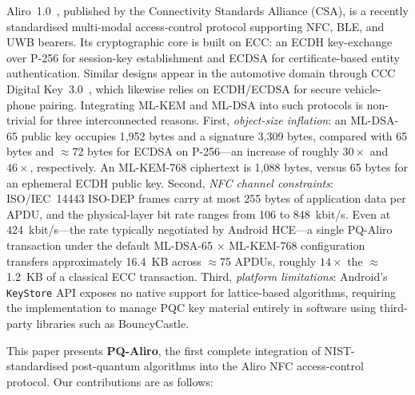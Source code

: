 Aliro~1.0~\cite{CSA:Aliro10}, published by the Connectivity Standards Alliance
(CSA), is a recently standardised multi-modal access-control protocol supporting
NFC, BLE, and UWB bearers.
Its cryptographic core is built on ECC: an ECDH key-exchange over P-256 for
session-key establishment and ECDSA for certificate-based entity authentication.
Similar designs appear in the automotive domain through CCC Digital
Key~3.0~\cite{CCC:DigKey3}, which likewise relies on ECDH/ECDSA for secure
vehicle-phone pairing.
Integrating ML-KEM and ML-DSA into such protocols is non-trivial for three
interconnected reasons.
First, \emph{object-size inflation}: an ML-DSA-65 public key occupies 1{,}952
bytes and a signature 3{,}309 bytes, compared with 65 bytes and $\approx$72
bytes for ECDSA on P-256---an increase of roughly $30\times$ and $46\times$,
respectively.
An ML-KEM-768 ciphertext is 1{,}088 bytes, versus 65 bytes for an ephemeral
ECDH public key.
Second, \emph{NFC channel constraints}: ISO/IEC~14443 ISO-DEP frames carry at
most 255 bytes of application data per APDU, and the physical-layer bit rate
ranges from 106 to 848~kbit/s.
Even at 424~kbit/s---the rate typically negotiated by Android HCE---a single
PQ-Aliro transaction under the default ML-DSA-65 $\times$ ML-KEM-768
configuration transfers approximately 16.4~KB across $\approx$75 APDUs, roughly
$14\times$ the $\approx$1.2~KB of a classical ECC transaction.
Third, \emph{platform limitations}: Android's \texttt{KeyStore} API exposes no
native support for lattice-based algorithms, requiring the implementation to
manage PQC key material entirely in software using third-party libraries such as
BouncyCastle.

This paper presents \textbf{PQ-Aliro}, the first complete integration of
NIST-standardised post-quantum algorithms into the Aliro NFC access-control
protocol.
Our contributions are as follows:

